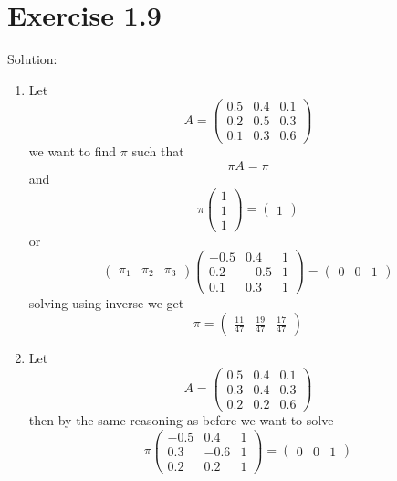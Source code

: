 \documentclass[11pt]{article}
\newcommand{\solution}[1]{{{\textcolor{header}{Solution:} \textcolor{solution}{#1}}}}
\begin{document}
\section{Exercise 1.9}
\solution{
    \begin{enumerate}
        \item Let
            \[
                A = \begin{pmatrix} 0.5 & 0.4 & 0.1 \\ 0.2 & 0.5 & 0.3 \\ 0.1 & 0.3 & 0.6 \end{pmatrix} 
            \] 
            we want to find $\pi$ such that
            \[
            \pi A = \pi
            \] 
            and
            \[
                \pi \begin{pmatrix} 1 \\ 1 \\ 1 \end{pmatrix} = \begin{pmatrix} 1 \end{pmatrix} 
            \] 
            or
            \[
                \begin{pmatrix} \pi_1 & \pi_2 & \pi_3 \end{pmatrix}  \begin{pmatrix}  -0.5 & 0.4 & 1 \\ 0.2 & -0.5 & 1 \\ 0.1 & 0.3 & 1\end{pmatrix} = \begin{pmatrix} 0 & 0 & 1 \end{pmatrix} 
            \] 
            solving using inverse we get
            \[
                \pi = \begin{pmatrix} \frac{11}{47} & \frac{19}{47} & \frac{17}{47} \end{pmatrix} 
            \] 
        \item Let
            \[
                A = \begin{pmatrix} 0.5 & 0.4 & 0.1 \\ 0.3 & 0.4 & 0.3 \\ 0.2 & 0.2 & 0.6 \end{pmatrix} 
            \] 
            then by the same reasoning as before we want to solve
            \[
                \pi \begin{pmatrix} -0.5 & 0.4 & 1 \\ 0.3 & -0.6 & 1\\ 0.2 & 0.2 & 1 \end{pmatrix} = \begin{pmatrix} 0 & 0 & 1 \end{pmatrix} 
\]
\end{enumerate}}
\end{document}
